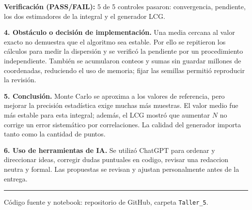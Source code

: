 \documentclass[11pt]{article}
\begin{document}
\textbf{Verificación (PASS/FAIL):} 5 de 5 controles pasaron: convergencia, pendiente, los dos estimadores de la integral y el generador LCG.

\textbf{4. Obstáculo o decisión de implementación.}
Una media cercana al valor exacto no demuestra que el algoritmo sea estable. Por ello se repitieron los cálculos para medir la dispersión y se verificó la pendiente por un procedimiento independiente. También se acumularon conteos y sumas sin guardar millones de coordenadas, reduciendo el uso de memoria; fijar las semillas permitió reproducir la revisión.

\textbf{5. Conclusión.}
Monte Carlo se aproxima a los valores de referencia, pero mejorar la precisión estadística exige muchas más muestras. El valor medio fue más estable para esta integral; además, el LCG mostró que aumentar \(N\) no corrige un error sistemático por correlaciones. La calidad del generador importa tanto como la cantidad de puntos.

\textbf{6. Uso de herramientas de IA.}
Se utilizó ChatGPT para ordenar y direccionar ideas, corregir dudas puntuales en codigo, revisar una redaccion neutra y formal. Las propuestas se revisan y ajustan personalmente antes de la entrega.

\vspace{4pt}\hrule\vspace{4pt}
{\small Código fuente y notebook: repositorio de GitHub, carpeta \texttt{Taller\_5}.}
\end{document}
